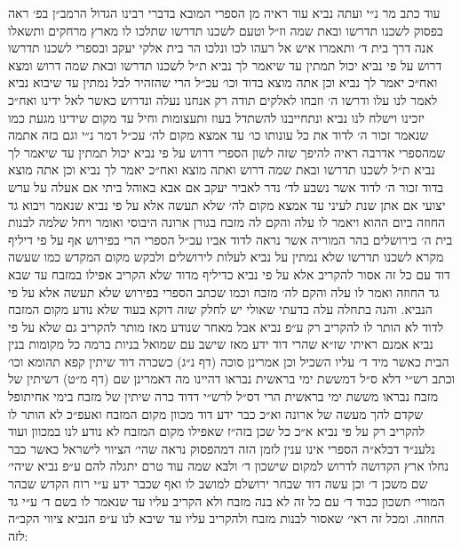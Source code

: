 \documentclass[12pt, openany]{book}
\begin{document}
\begin{multicols}{2}
עוד כתב מר נ״י ועתה נביא עוד ראיה מן הספרי המובא בדברי רבינו הגדול הרמב״ן בפ׳ ראה בפסוק לשכנו תדרשו ובאת שמה וז״ל וטעם לשכנו תדרשו שתלכו לו מארץ מרחקים ותשאלו אנה דרך בית ד׳ ותאמרו איש אל רעהו לכו ונלכו הר בית אלקי יעקב ובספרי לשכנו תדרשו דרוש על פי נביא יכול תמתין עד שיאמר לך נביא ת״ל לשכנו תדרשו ובאת שמה דרוש ומצא ואח״כ יאמר לך נביא וכן אתה מוצא בדוד וכו׳ עכ״ל הרי שהזהיר לבל נמתין עד שיבוא נביא לאמר לנו עלו ודרשו ה׳ וזבחו לאלקים תודה רק אנחנו נעלה ונדרוש כאשר לאל ידינו ואח״כ יזכינו וישלח לנו נביא ונתחייבנו להשתדל בעוז ותעצומות וחיל עד מקום שידינו מגעת כמו שנאמר זכור ה׳ לדוד את כל עונותו כו׳ עד אמצא מקום לה׳ עכ״ל דמר נ״י וגם בזה אתמה שמהספרי אדרבה ראיה להיפך שזה לשון הספרי דרוש על פי נביא יכול תמתין עד שיאמר לך נביא ת״ל לשכנו תדרשו ובאת שמה דרוש ואתה מוצא ואח״כ יאמר לך נביא וכן אתה מוצא בדוד זכור ה׳ לדוד אשר נשבע לד׳ נדר לאביר יעקב אם אבא באוהל ביתי אם אעלה על ערש יצועי אם אתן שנת לעיני עד אמצא מקום לה׳ שלא תעשה אלא על פי נביא שנאמר ויבוא גד החוזה ביום ההוא ויאמר לו עלה והקם לה מזבח בגורן ארונה היבוסי ואומר ויחל שלמה לבנות בית ה׳ בירושלים בהר המוריה אשר נראה לדוד אביו עכ״ל הספרי הרי בפירוש אף על פי דיליף מקרא לשכנו תדרשו שלא נמתין על נביא לעלות לירושלים ולבקש מקום המקדש כמו שעשה דוד עם כל זה אסור להקריב אלא על פי נביא כדיליף מדוד שלא הקריב אפילו במזבח עד שבא גד החוזה ואמר לו עלה והקם לה׳ מזבח וכמו שכתב הספרי בפירוש שלא תעשה אלא על פי הנביא. והנה בתחלה עלה בדעתי שאולי יש לחלק שזה דוקא בעוד שלא נודע מקום המזבח לדוד לא הותר לו להקריב רק ע״פ נביא אבל מאחר שנודע מאז מותר להקריב גם שלא על פי נביא אמנם ראיתי שז״א שהרי דוד ידע מאז שישב עם שמואל בניות ברמה כל מקומות בנין הבית כאשר מיד ד׳ עליו השכיל וכן אמרינן סוכה (דף נ״ג) כשכרה דוד שיתין קפא תהומא וכו׳ וכתב רש״י דלא ס״ל דמששת ימי בראשית נבראו דהיינו מה דאמרינן שם (דף מ״ט) דשיתין של מזבח נבראו מששת ימי בראשית הרי דס״ל לרש״י דדוד כרה שיתין של מזבח בימי אחיתופל שקדם להך מעשה של ארונה וא״כ כבר ידע דוד מכוון מקום המזבח ואעפ״כ לא הותר לו להקריב רק על פי נביא א״כ כל שכן בזה״ז שאפילו מקום המזבח לא נודע לנו במכוון ועוד נלענ״ד דבלא״ה הספרי אינו ענין לזמן הזה דמהפסוק נראה שהי׳ הציווי לישראל כאשר כבר נחלו ארץ הקדושה לדרוש למקום שישכון ד׳ ולבא שמה עוד טרם יתגלה להם ע״פ נביא שיהי׳ שם משכן ד׳ וכן עשה דוד שבחר ירושלם למושב לו ואף שכבר ידע ע״י רוח הקדש שבהר המורי׳ תשכון כבוד ד׳ עם כל זה לא בנה מזבח ולא הקריב עליו עד שנאמר לו בשם ד׳ ע״י גד החוזה. ומכל זה ראי׳ שאסור לבנות מזבח ולהקריב עליו עד שיבא לנו ע״פ הנביא ציווי הקב״ה לזה:\\\vspace{0pt}


\end{multicols}
\end{document}
